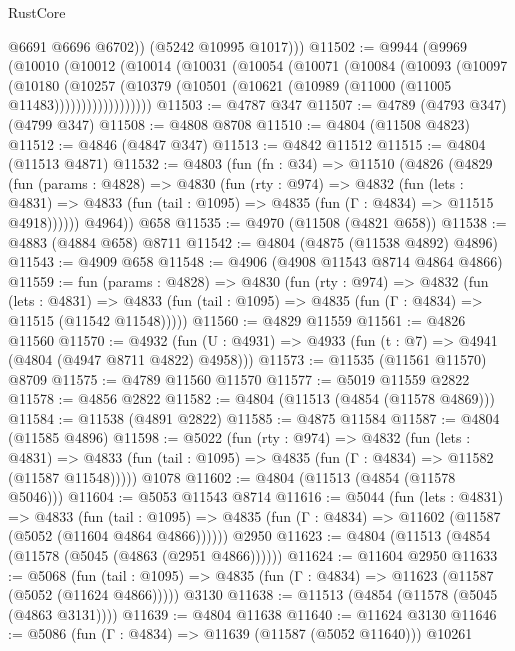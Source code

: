 \begin{lexlean}{RustCore}
\begin{coremodule}
            @6691
            @6696
            @6702))
        (@5242 @10995 @1017)))
@11502 := @9944
    (@9969
      (@10010
        (@10012
          (@10014
            (@10031
              (@10054
                (@10071
                  (@10084
                    (@10093
                      (@10097
                        (@10180
                          (@10257
                            (@10379 (@10501 (@10621 (@10989 (@11000 (@11005 @11483))))))))))))))))))
@11503 := @4787 @347
@11507 := @4789 (@4793 @347) (@4799 @347)
@11508 := @4808 @8708
@11510 := @4804 (@11508 @4823)
@11512 := @4846 (@4847 @347)
@11513 := @4842 @11512
@11515 := @4804 (@11513 @4871)
@11532 := @4803
    (fun (fn : @34) =>
    @11510
      (@4826
        (@4829
          (fun (params : @4828) =>
          @4830
            (fun (rty : @974) =>
            @4832
              (fun (lets : @4831) =>
              @4833 (fun (tail : @1095) => @4835 (fun (Γ : @4834) => @11515 @4918))))))
        @4964))
    @658
@11535 := @4970 (@11508 (@4821 @658))
@11538 := @4883 (@4884 @658) @8711
@11542 := @4804 (@4875 (@11538 @4892) @4896)
@11543 := @4909 @658
@11548 := @4906 (@4908 @11543 @8714 @4864 @4866)
@11559 := fun (params : @4828) =>
  @4830
    (fun (rty : @974) =>
    @4832
      (fun (lets : @4831) =>
      @4833 (fun (tail : @1095) => @4835 (fun (Γ : @4834) => @11515 (@11542 @11548)))))
@11560 := @4829 @11559
@11561 := @4826 @11560
@11570 := @4932 (fun (U : @4931) => @4933 (fun (t : @7) => @4941 (@4804 (@4947 @8711 @4822) @4958)))
@11573 := @11535 (@11561 @11570) @8709
@11575 := @4789 @11560 @11570
@11577 := @5019 @11559 @2822
@11578 := @4856 @2822
@11582 := @4804 (@11513 (@4854 (@11578 @4869)))
@11584 := @11538 (@4891 @2822)
@11585 := @4875 @11584
@11587 := @4804 (@11585 @4896)
@11598 := @5022
    (fun (rty : @974) =>
    @4832
      (fun (lets : @4831) =>
      @4833 (fun (tail : @1095) => @4835 (fun (Γ : @4834) => @11582 (@11587 @11548)))))
    @1078
@11602 := @4804 (@11513 (@4854 (@11578 @5046)))
@11604 := @5053 @11543 @8714
@11616 := @5044
    (fun (lets : @4831) =>
    @4833
      (fun (tail : @1095) =>
      @4835 (fun (Γ : @4834) => @11602 (@11587 (@5052 (@11604 @4864 @4866))))))
    @2950
@11623 := @4804 (@11513 (@4854 (@11578 (@5045 (@4863 (@2951 @4866))))))
@11624 := @11604 @2950
@11633 := @5068
    (fun (tail : @1095) => @4835 (fun (Γ : @4834) => @11623 (@11587 (@5052 (@11624 @4866)))))
    @3130
@11638 := @11513 (@4854 (@11578 (@5045 (@4863 @3131))))
@11639 := @4804 @11638
@11640 := @11624 @3130
@11646 := @5086 (fun (Γ : @4834) => @11639 (@11587 (@5052 @11640))) @10261

\end{coremodule}
\end{lexlean}
